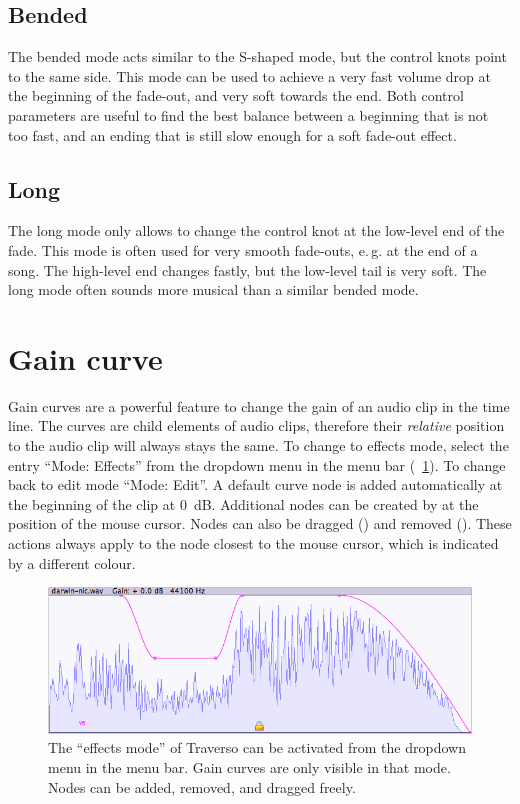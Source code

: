 \subsection{Bended}
The bended mode acts similar to the S-shaped mode, but the control knots point to the same side. This mode can be used to achieve a very fast volume drop at the beginning of the fade-out, and very soft towards the end. Both control parameters are useful to find the best balance between a beginning that is not too fast, and an ending that is still slow enough for a soft fade-out effect.

\subsection{Long}
The long mode only allows to change the control knot at the low-level end of the fade. This mode is often used for very smooth fade-outs, e.\,g. at the end of a song. The high-level end changes fastly, but the low-level tail is very soft. The long mode often sounds more musical than a similar bended mode.

\section{Gain curve}
Gain curves are a powerful feature to change the gain of an audio clip in the time line. The curves are child elements of audio clips, therefore their \emph{relative} position to the audio clip will always stays the same. To change to effects mode, select the entry ``Mode: Effects'' from the dropdown menu in the menu bar (\FigB~\ref{fig_gcurve01}). To change back to edit mode ``Mode: Edit''. A default curve node is added automatically at the beginning of the clip at 0~dB. Additional nodes can be created by  at the position of the mouse cursor. Nodes can also be dragged () and removed (). These actions always apply to the node closest to the mouse cursor, which is indicated by a different colour.

\begin{figure}[t]
 \centering\includegraphics[width=\textwidth]{images/gcurve01}
 \caption{The ``effects mode'' of Traverso can be activated from the dropdown menu in the menu bar. Gain curves are only visible in that mode. Nodes can be added, removed, and dragged freely.}
 \label{fig_gcurve01}
\end{figure}

